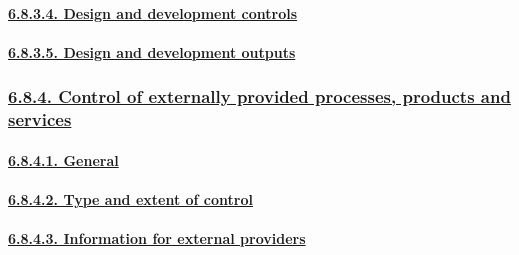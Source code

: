 \documentclass[
]{article}
\begin{document}
\hypertarget{design-and-development-controls}{%
\paragraph{\texorpdfstring{\protect\hyperlink{design-and-development-controls-1}{6.8.3.4.
Design and development
controls}}{6.8.3.4. Design and development controls}}\label{design-and-development-controls}}

\hypertarget{design-and-development-outputs}{%
\paragraph{\texorpdfstring{\protect\hyperlink{design-and-development-outputs-1}{6.8.3.5.
Design and development
outputs}}{6.8.3.5. Design and development outputs}}\label{design-and-development-outputs}}

\hypertarget{control-of-externally-provided-processes-products-and-services}{%
\subsubsection{\texorpdfstring{\protect\hyperlink{control-of-externally-provided-processes-products-and-services-1}{6.8.4.
Control of externally provided processes, products and
services}}{6.8.4. Control of externally provided processes, products and services}}\label{control-of-externally-provided-processes-products-and-services}}

\hypertarget{general-5}{%
\paragraph{\texorpdfstring{\protect\hyperlink{general-14}{6.8.4.1.
General}}{6.8.4.1. General}}\label{general-5}}

\hypertarget{type-and-extent-of-control}{%
\paragraph{\texorpdfstring{\protect\hyperlink{type-and-extent-of-control-1}{6.8.4.2.
Type and extent of
control}}{6.8.4.2. Type and extent of control}}\label{type-and-extent-of-control}}

\hypertarget{information-for-external-providers}{%
\paragraph{\texorpdfstring{\protect\hyperlink{information-for-external-providers-1}{6.8.4.3.
Information for external
providers}}{6.8.4.3. Information for external providers}}\label{information-for-external-providers}}
\end{document}
